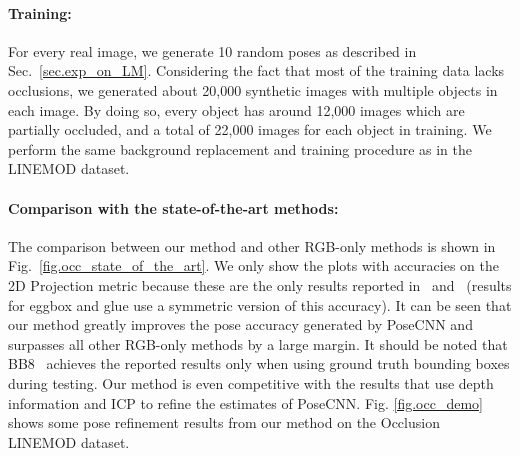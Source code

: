 \documentclass[twocolumn]{svjour3}
\begin{document}
\paragraph{Training:} For every real image, we generate 10 random poses as described in Sec.~\ref{sec.exp_on_LM}. Considering the fact that most of the training data lacks occlusions, we generated about 20,000 synthetic images with multiple objects in each image. By doing so, every object has around 12,000 images which are partially occluded, and a total of 22,000 images for each object in training. We perform the same background replacement and training procedure as in the LINEMOD dataset. 


\paragraph{Comparison with the state-of-the-art methods:} The comparison between our method and other RGB-only methods is shown in Fig.~\ref{fig.occ_state_of_the_art}. We only show the plots with accuracies on the 2D Projection metric because these are the only results reported in~\citep{rad2017bb8} and~\citep{tekin2017real} (results for eggbox and glue use a symmetric version of this accuracy). It can be seen that our method greatly improves the pose accuracy generated by PoseCNN and surpasses all other RGB-only methods by a large margin. It should be noted that BB8~\citep{rad2017bb8}  achieves the reported results only when using ground truth bounding boxes during testing. Our method is even competitive with the results that use depth information and ICP to refine the estimates of PoseCNN. Fig. \ref{fig.occ_demo} shows some pose refinement results from our method on the Occlusion LINEMOD dataset.
\end{document}
